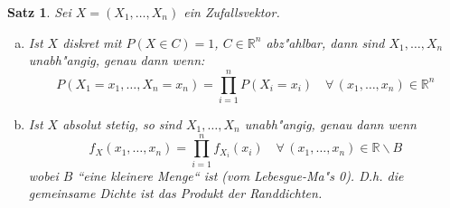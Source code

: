 \documentclass[a4paper,11pt]{book}
\newcommand{\R}{{\mathbb R}}
\newtheorem{Sa}{Satz}[chapter]
\theoremstyle{nonumberplain}
\begin{document}
\begin{Sa}
Sei $X=(X_1,\ldots ,X_n)$ ein Zufallsvektor.
\begin{enumerate}[a)]
\item Ist $X$ diskret mit $P(X\in C)=1$, $C\in\R^n$ abz"ahlbar, dann sind $X_1,\ldots ,X_n$ unabh"angig, genau dann wenn:
\[P(X_1=x_1,\ldots ,X_n=x_n)=\prod_{i=1}^n P(X_i=x_i) \quad\forall\,(x_1,\ldots ,x_n)\in\R^n\]
\item Ist $X$ absolut stetig, so sind $X_1,\ldots ,X_n$ unabh"angig, genau dann wenn 
\[f_X(x_1,\ldots ,x_n)=\prod_{i=1}^n f_{X_i}(x_i)\quad\forall\,(x_1,\ldots ,x_n)\in\R\backslash B\] wobei $B$ ``eine kleinere Menge`` ist (vom Lebesgue-Ma"s 0). D.h. die gemeinsame Dichte ist das Produkt der Randdichten. 
\end{enumerate}
\end{Sa}

 
\end{document}
